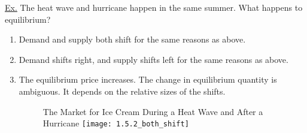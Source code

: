 	\newpage
	
	\noindent \underline{Ex.} The heat wave and hurricane happen in the same summer. What happens to equilibrium?
	
	\begin{enumerate}
	
	\item Demand and supply both shift for the same reasons as above.
	
	\item Demand shifts right, and supply shifts left for the same reasons as above.
	
	\item The equilibrium price increases. The change in equilibrium quantity is ambiguous. It depends on the relative sizes of the shifts. 
	
	\begin{figure}[h]
	The Market for Ice Cream During a Heat Wave and After a Hurricane
	\centering
	\texttt{[image: 1.5.2\_both\_shift]}
	\end{figure}
	
	\end{enumerate}




